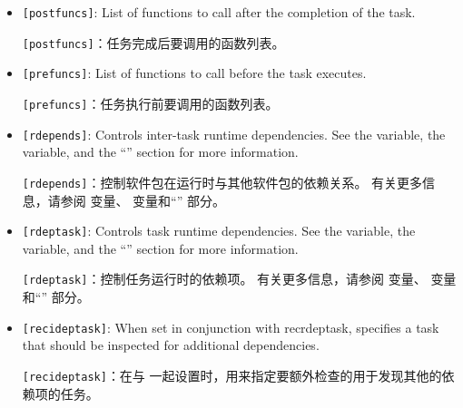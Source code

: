 \begin{itemize}
\begin{noteblock}{Warning}
\begin{itemize}
\medskip
只在单独的配方中而不是全局性的设置此变量标志（varflag）可能会导致不可预测的行为。

\item Setting the varflag to a value greater than the value used in the  variable causes  to have no effect.

\medskip
将此变量标志（varflag）的值设置为大于  变量中使用的值会导致  不起作用。
\end{itemize}
\end{noteblock}

\item \texttt{[postfuncs]}: List of functions to call after the completion of the task.

\medskip
\texttt{[postfuncs]}：任务完成后要调用的函数列表。

\item \texttt{[prefuncs]}: List of functions to call before the task executes.

\medskip
\texttt{[prefuncs]}：任务执行前要调用的函数列表。

\item \texttt{[rdepends]}: Controls inter-task runtime dependencies. See the  variable, the  variable, and the ``'' section for more information.

\medskip
\texttt{[rdepends]}：控制软件包在运行时与其他软件包的依赖关系。 有关更多信息，请参阅  变量、  变量和``'' 部分。

\item \texttt{[rdeptask]}: Controls task runtime dependencies. See the  variable, the  variable, and the ``'' section for more information.

\medskip
\texttt{[rdeptask]}：控制任务运行时的依赖项。 有关更多信息，请参阅  变量、  变量和``'' 部分。

\item \texttt{[recideptask]}: When set in conjunction with recrdeptask, specifies a task that should be inspected for additional dependencies.

\medskip
\texttt{[recideptask]}：在与  一起设置时，用来指定要额外检查的用于发现其他的依赖项的任务。


\end{itemize}
